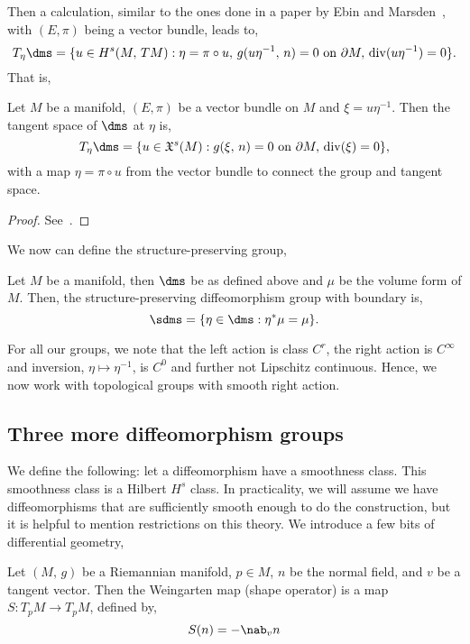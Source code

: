 \noindent
Then a calculation, similar to the ones done in a paper by Ebin and Marsden~\cite{diffeost}, with $(E, \pi)$ being a vector bundle, leads to,
$$ T_\eta \dms = \{u \in H^s(M,\, TM) : \eta = \pi \circ u,\, g(u\eta^{-1},\, n) = 0 \text{ on } \partial M,\, \mathrm{div}(u \eta^{-1}) = 0 \}. $$
That is,
\begin{nlemma}
  Let $M$ be a manifold, $(E, \pi)$ be a vector bundle on $M$ and $\xi = u\eta^{-1}$. Then the tangent space of $\dms$ at $\eta$ is,
  $$ T_\eta\dms = \{u \in \mathfrak{X}^s(M) : g(\xi,\, n) = 0 \text{ on }\partial M,\, \mathrm{div}(\xi) = 0\}, $$
  with a map $\eta = \pi \circ u$ from the vector bundle to connect the group and tangent space.
\end{nlemma}
\begin{proof}
  See~\cite{diffeost}.
\end{proof}

\noindent
We now can define the structure-preserving group,
\begin{ndefi}
  Let $M$ be a manifold, then $\dms$ be as defined above and $\mu$ be the volume form of $M$. Then, the structure-preserving diffeomorphism group with boundary is,
  $$ \sdms = \{\eta \in \dms : \eta^* \mu = \mu \}. $$
\end{ndefi}
\noindent
For all our groups, we note that the left action is class $C^r$, the right action is $C^\infty$ and inversion, $\eta \mapsto \eta^{-1}$, is $C^0$ and further not Lipschitz continuous. Hence, we now work with topological groups with smooth right action.

\noindent
\subsection{Three more diffeomorphism groups}
We define the following: let a diffeomorphism have a smoothness class. This smoothness class is a Hilbert $ H^s$ class. In practicality, we will assume we have diffeomorphisms that are sufficiently smooth enough to do the construction, but it is helpful to mention restrictions on this theory. We introduce a few bits of differential geometry,
\begin{ndefi}
  Let $(M,\, g)$ be a Riemannian manifold, $p \in M$, $n$ be the normal field, and $v$ be a tangent vector. Then the Weingarten map (shape operator) is a map $S: T_pM \to T_pM$, defined by,
  $$ S(n) = -\nab_v n $$
\end{ndefi}

